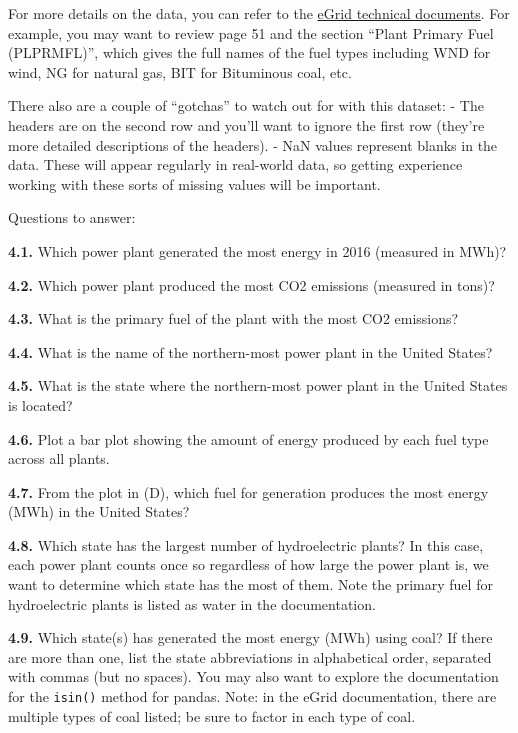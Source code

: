 \documentclass[
  letterpaper,
  DIV=11,
  numbers=noendperiod]{scrartcl}
\begin{document}
For more details on the data, you can refer to the
\href{https://www.epa.gov/sites/default/files/2020-01/documents/egrid2018_technical_support_document.pdf}{eGrid
technical documents}. For example, you may want to review page 51 and
the section ``Plant Primary Fuel (PLPRMFL)'', which gives the full names
of the fuel types including WND for wind, NG for natural gas, BIT for
Bituminous coal, etc.

There also are a couple of ``gotchas'' to watch out for with this
dataset: - The headers are on the second row and you'll want to ignore
the first row (they're more detailed descriptions of the headers). - NaN
values represent blanks in the data. These will appear regularly in
real-world data, so getting experience working with these sorts of
missing values will be important.

Questions to answer:

\textbf{4.1.} Which power plant generated the most energy in 2016
(measured in MWh)?

\textbf{4.2.} Which power plant produced the most CO2 emissions
(measured in tons)?

\textbf{4.3.} What is the primary fuel of the plant with the most CO2
emissions?

\textbf{4.4.} What is the name of the northern-most power plant in the
United States?

\textbf{4.5.} What is the state where the northern-most power plant in
the United States is located?

\textbf{4.6.} Plot a bar plot showing the amount of energy produced by
each fuel type across all plants.

\textbf{4.7.} From the plot in (D), which fuel for generation produces
the most energy (MWh) in the United States?

\textbf{4.8.} Which state has the largest number of hydroelectric
plants? In this case, each power plant counts once so regardless of how
large the power plant is, we want to determine which state has the most
of them. Note the primary fuel for hydroelectric plants is listed as
water in the documentation.

\textbf{4.9.} Which state(s) has generated the most energy (MWh) using
coal? If there are more than one, list the state abbreviations in
alphabetical order, separated with commas (but no spaces). You may also
want to explore the documentation for the \texttt{isin()} method for
pandas. Note: in the eGrid documentation, there are multiple types of
coal listed; be sure to factor in each type of coal.
\end{document}
